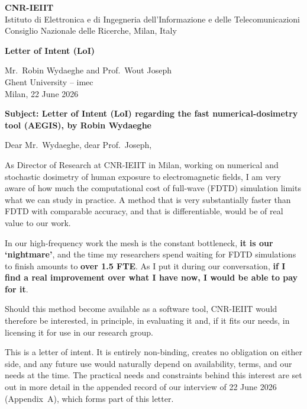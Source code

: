\documentclass[11pt]{article}
\begin{document}
{\large\textbf{CNR-IEIIT}}\\
Istituto di Elettronica e di Ingegneria dell'Informazione e delle Telecomunicazioni\\
Consiglio Nazionale delle Ricerche, Milan, Italy\\[1.5em]

\begin{center}
\textbf{\Large Letter of Intent (LoI)}
\end{center}

\bigskip
\begin{flushright}
Mr.\ Robin Wydaeghe and Prof.\ Wout Joseph\\
Ghent University -- imec\\[1em]
Milan, 22 June 2026
\end{flushright}

\bigskip
\textbf{Subject: Letter of Intent (LoI) regarding the fast numerical-dosimetry tool (AEGIS),
by Robin Wydaeghe}

\bigskip
Dear Mr.\ Wydaeghe, dear Prof.\ Joseph,

As Director of Research at CNR-IEIIT in Milan, working on numerical and stochastic dosimetry
of human exposure to electromagnetic fields, I am very aware of how much the computational
cost of full-wave (FDTD) simulation limits what we can study in practice. A method that is
very substantially faster than FDTD with comparable accuracy, and that is differentiable,
would be of real value to our work.

In our high-frequency work the mesh is the constant bottleneck, \textbf{it is our `nightmare'},
and the time my researchers spend waiting for FDTD simulations to finish amounts to
\textbf{over 1.5 FTE}. As I put it during our conversation, \textbf{if I find a real improvement
over what I have now, I would be able to pay for it}.

Should this method become available as a software tool, CNR-IEIIT would therefore be
interested, in principle, in evaluating it and, if it fits our needs, in licensing it for use
in our research group.

This is a letter of intent. It is entirely non-binding, creates no obligation on either side,
and any future use would naturally depend on availability, terms, and our needs at the time.
The practical needs and constraints behind this interest are set out in more detail in the
appended record of our interview of 22 June 2026 (Appendix~A), which forms part of this letter.
\end{document}
